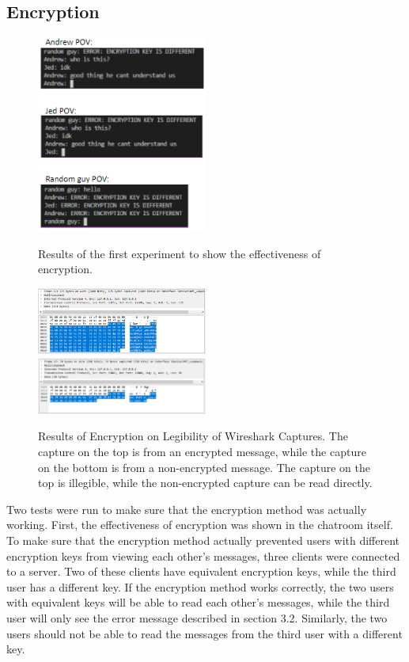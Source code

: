 \documentclass{article}
\begin{document}
\subsection{Encryption}

\begin{figure}[h]
\centering
\caption{Results of the first experiment to show the effectiveness of encryption.}
\includegraphics[width=0.5\textwidth]{media/EncryptionExperiment.PNG}
\label{Encryption Results Figure}
\end{figure}

\begin{figure}[h]
\centering
\caption{Results of Encryption on Legibility of Wireshark Captures. The capture on the top is from an encrypted message, while the capture on the bottom is from a non-encrypted message. The capture on the top is illegible, while the non-encrypted capture can be read directly.}
\includegraphics[width=0.5\textwidth]{media/WiresharkEncryptionResults1.PNG}
\includegraphics[width=0.5\textwidth]{media/WiresharkEncryptionResults2.PNG}
\label{Encryption Wireshark Results}
\end{figure}

Two tests were run to make sure that the encryption method was actually working. First, the effectiveness of encryption was shown in the chatroom itself. To make sure that the encryption method actually prevented users with different encryption keys from viewing each other's messages, three clients were connected to a server. Two of these clients have equivalent encryption keys, while the third user has a different key. If the encryption method works correctly, the two users with equivalent keys will be able to read each other's messages, while the third user will only see the error message described in section 3.2. Similarly, the two users should not be able to read the messages from the third user with a different key. 
\end{document}
